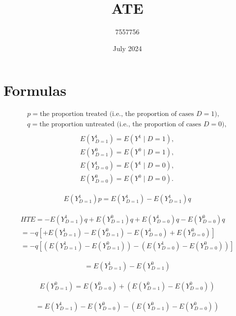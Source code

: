 \documentclass{article}
\title{ATE}
\author{7557756}
\date{July 2024}
\begin{document}
\maketitle

\section{Formulas}

\begin{align*}
p = \text{the proportion treated (i.e., the proportion of cases } D=1), \\
q = \text{the proportion untreated (i.e., the proportion of cases } D=0), \\
\end{align*}
\begin{align*}
E(Y^1_{D=1}) = E(Y^1 \mid D=1), \\
E(Y^0_{D=1}) = E(Y^0 \mid D=1), \\
E(Y^1_{D=0}) = E(Y^1 \mid D=0), \\
E(Y^0_{D=0}) = E(Y^0 \mid D=0).
\end{align*}

\begin{align*}
E(Y^1_{D=1})p = E(Y^1_{D=1}) - E(Y^1_{D=1})q 
\end{align*}

\begin{align*}
HTE = -E(Y^1_{D=1})q + E(Y^0_{D=1})q + E(Y^1_{D=0})q - E(Y^0_{D=0})q \\
= -q[+E(Y^1_{D=1}) - E(Y^0_{D=1}) - E(Y^1_{D=0}) + E(Y^0_{D=0})] \\
= -q[(E(Y^1_{D=1}) - E(Y^0_{D=1})) - ( E(Y^1_{D=0}) - E(Y^0_{D=0}))] 
\end{align*}

\begin{align*}
= E(Y^1_{D=1}) - E(Y^0_{D=1})
\end{align*}

\begin{align*}
E(Y^0_{D=1}) =  E(Y^0_{D=0}) + (E(Y^0_{D=1})- E(Y^0_{D=0}))
\end{align*}

\begin{align*}
= E(Y^1_{D=1}) - E(Y^0_{D=0}) - (E(Y^0_{D=1})- E(Y^0_{D=0}))
\end{align*}
    
\end{document}
